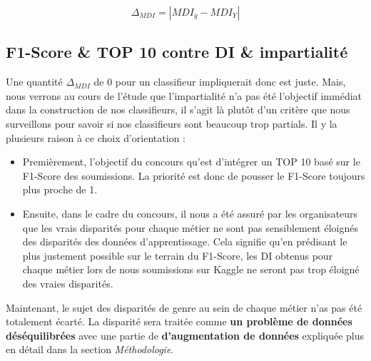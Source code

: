$$ \Delta_{MDI} = | MDI_{g}- MDI_{Y} | $$

\subsection{F1-Score \& TOP 10 contre DI \& impartialité} \hfill
\newline

Une quantité $\Delta_{MDI}$ de $0$ pour un classifieur impliquerait donc  est juste. Mais, nous verrons au cours de l'étude que l'impartialité n'a pas été l'objectif immédiat dans la construction de nos classifieurs, il s'agit là plutôt d'un critère que nous surveillons pour savoir si nos classifieurs sont beaucoup trop partials. Il y la plusieurs raison à ce choix d'orientation :

\begin{itemize}
\item Premièrement, l'objectif du concours qu'est d'intégrer un TOP 10 basé sur le F1-Score des soumissions. La priorité est donc de pousser le F1-Score toujours plus proche de 1.
\item Ensuite, dans le cadre du concours, il nous a été assuré par les organisateurs que les vrais disparités pour chaque métier ne sont pas sensiblement éloignés des disparités des données d'apprentissage. Cela signifie qu'en prédisant le plus justement possible sur le terrain du F1-Score, les DI obtenus pour chaque métier lors de nous soumissions sur Kaggle ne seront pas trop éloigné des vraies disparités.
\end{itemize}

\hfill

Maintenant, le sujet des disparités de genre au sein de chaque métier n'as pas été totalement écarté. La disparité sera traitée comme \textbf{un problème de données déséquilibrées} avec une partie de \textbf{d'augmentation de données} expliquée plus en détail dans la section \emph{Méthodologie}.

